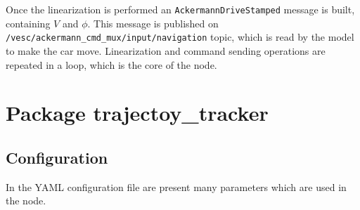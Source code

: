 \documentclass[12pt, letterpaper]{report}
\begin{document}
Once the linearization is performed an \verb|AckermannDriveStamped| message is built, containing $V$ and $\phi$. This message is published on \\ \verb|/vesc/ackermann_cmd_mux/input/navigation| topic, which is read by the model to make the car move. Linearization and command sending operations are repeated in a loop, which is the core of the node.

\section{Package trajectoy\_tracker}

\subsection{Configuration}

In the YAML configuration file are present many parameters which are used in the node.
\end{document}
